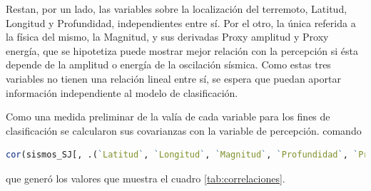 \documentclass[a4paper]{report}
\begin{document}
Restan, por un lado, las variables sobre la localización del terremoto, Latitud, Longitud y Profundidad, independientes entre sí.
Por el otro, la única referida a la física del mismo, la Magnitud, y sus derivadas Proxy amplitud y Proxy energía, que se hipotetiza puede mostrar mejor relación con la percepción si ésta depende de la amplitud o energía de la oscilación sísmica.
Como estas tres variables no tienen una relación lineal entre sí, se espera que puedan aportar información independiente al modelo de clasificación.

Como una medida preliminar de la valía de cada variable para los fines de clasificación se calcularon sus covarianzas con la variable de percepción.
 comando
\begin{lstlisting}[breaklines=true, language=R]
 cor(sismos_SJ[, .(`Latitud`, `Longitud`, `Magnitud`, `Profundidad`, `Proxy amplitud`, `Proxy energia`, Percibido)])
\end{lstlisting}	
 que generó los valores que muestra el cuadro \ref{tab:correlaciones}. 

\begin{table}[!ht]
	\centering
	\caption{Covarianzas con la variable Percibido de las otras variables con las que buscará predecirse.}
	\label{tab:correlaciones}
\end{table}
\end{document}
